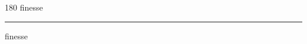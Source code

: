 
\begin{frame}
\begin{center}
\begin{turn}{180}
{\fontsize{2.5cm}{1em}\selectfont finesse}
\end{turn}
\vspace{1em}\par  
\hrule
\vspace{1em}\par  
{\fontsize{2.5cm}{1em}\selectfont finesse}
\end{center}
\end{frame}
